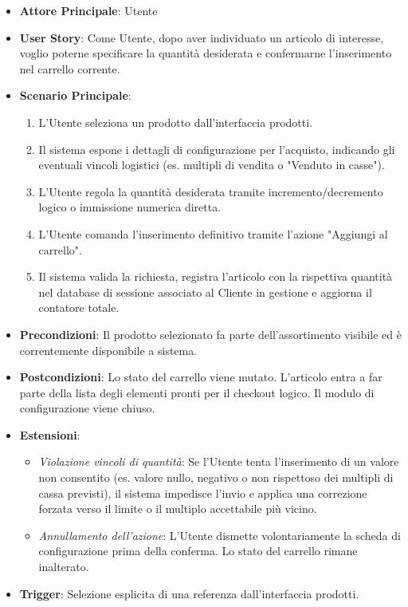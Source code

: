 \begin{itemize}
    \item \textbf{Attore Principale}: Utente
    \item \textbf{User Story}: Come Utente, dopo aver individuato un articolo di interesse, voglio poterne specificare la quantità desiderata e confermarne l'inserimento nel carrello corrente.
    \item \textbf{Scenario Principale}: 
    \begin{enumerate}
        \item L'Utente seleziona un prodotto dall'interfaccia prodotti.
        \item Il sistema espone i dettagli di configurazione per l'acquisto, indicando gli eventuali vincoli logistici (es. multipli di vendita o "Venduto in casse").
        \item L'Utente regola la quantità desiderata tramite incremento/decremento logico o immissione numerica diretta.
        \item L'Utente comanda l'inserimento definitivo tramite l'azione "Aggiungi al carrello".
        \item Il sistema valida la richiesta, registra l'articolo con la rispettiva quantità nel database di sessione associato al Cliente in gestione e aggiorna il contatore totale.
    \end{enumerate}
    \item \textbf{Precondizioni}: Il prodotto selezionato fa parte dell'assortimento visibile ed è correntemente disponibile a sistema.
    \item \textbf{Postcondizioni}: Lo stato del carrello viene mutato. L'articolo entra a far parte della lista degli elementi pronti per il checkout logico. Il modulo di configurazione viene chiuso.
    \item \textbf{Estensioni}:
    \begin{itemize}
        \item \textit{Violazione vincoli di quantità}: Se l'Utente tenta l'inserimento di un valore non consentito (es. valore nullo, negativo o non rispettoso dei multipli di cassa previsti), il sistema impedisce l'invio e applica una correzione forzata verso il limite o il multiplo accettabile più vicino.
        \item \textit{Annullamento dell'azione}: L'Utente dismette volontariamente la scheda di configurazione prima della conferma. Lo stato del carrello rimane inalterato.
    \end{itemize}
    \item \textbf{Trigger}: Selezione esplicita di una referenza dall'interfaccia prodotti.
\end{itemize}

